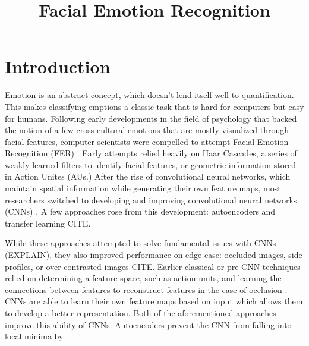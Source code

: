 \documentclass[conference]{IEEEtran}
\begin{document}
\title{Facial Emotion Recognition}

\author{
\and
{}
}

\maketitle

\begin{abstract}
\end{abstract}

\begin{IEEEkeywords}
\end{IEEEkeywords}

\section{Introduction}
Emotion is an abstract concept, which doesn't lend itself well to quantification. This makes classifying emptions a classic task that is hard for computers but easy for humans. Following early developments in the field of psychology that backed the notion of a few cross-cultural emotions that are mostly visualized through facial features, computer scientists were compelled to attempt Facial Emotion Recognition (FER) \cite{mehrabianInferenceAttitudesNonverbal1967} \cite{sauterCrossculturalRecognitionBasic2010}. Early attempts relied heavily on Haar Cascades, a series of weakly learned filters to identify facial features, or geometric information stored in Action Unites (AUs.) After the rise of convolutional neural networks, which maintain spatial information while generating their own feature maps, most researchers switched to developing and improving convolutional neural networks (CNNs) \cite{canalSurveyFacialEmotion2022}. A few approaches rose from this development: autoencoders and transfer learning CITE. 

While these approaches attempted to solve fundamental issues with CNNs (EXPLAIN), they also improved performance on edge case: occluded images, side profiles, or over-contrasted images CITE. Earlier classical or pre-CNN techniques relied on determining a feature space, such as action units, and learning the connections between features to reconstruct features in the case of occlusion \cite{miyakoshiFacialEmotionDetection2011}. CNNs are able to learn their own feature maps based on input which allows them to develop a better representation. Both of the aforementioned approaches improve this ability of CNNs. Autoencoders prevent the CNN from falling into local minima by 
\end{document}
